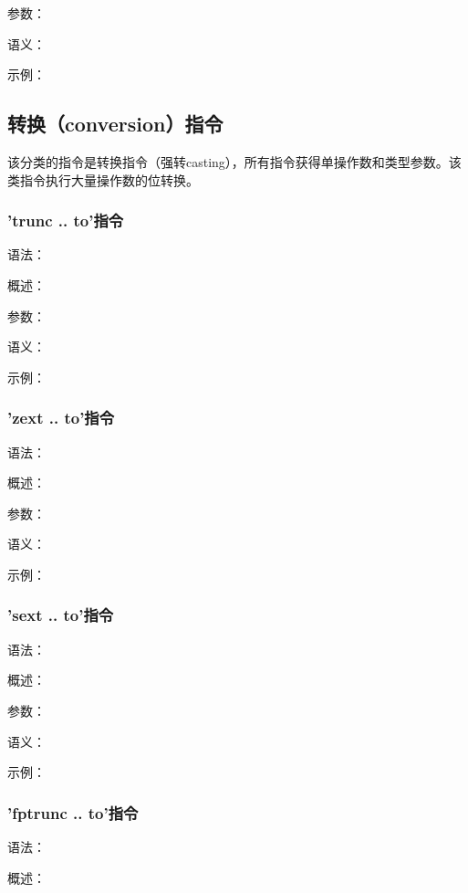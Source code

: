 \documentclass[12pt,a4paper]{article}
\begin{document}
{参数：

语义：

示例：


\subsection{转换（conversion）指令}

该分类的指令是转换指令（强转casting），所有指令获得单操作数和类型参数。该类指令执行大量操作数的位转换。

\subsubsection{'trunc .. to'指令} %

语法：

概述：

参数：

语义：

示例：


\subsubsection{'zext .. to'指令} %

语法：

概述：

参数：

语义：

示例：


\subsubsection{'sext .. to'指令} %

语法：

概述：

参数：

语义：

示例：


\subsubsection{'fptrunc .. to'指令} %

语法：

概述：

}
\end{document}
